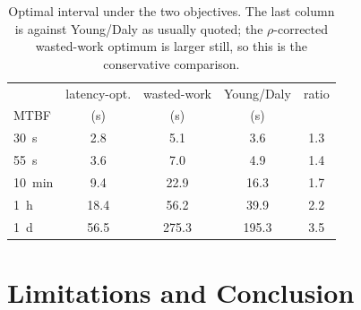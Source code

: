 \documentclass[conference]{IEEEtran}
\begin{document}
\begin{table}[t]
  \centering
  \caption{Optimal interval under the two objectives.
           The last column is against Young/Daly as usually quoted; the
           $\rho$-corrected wasted-work optimum is larger still, so this is the
           conservative comparison.}
  \label{tab:optimum}
  \begin{tabular}{l S[table-format=3.1] S[table-format=3.1] S[table-format=3.1] S[table-format=1.1]}
    \toprule
    & {latency-opt.} & {wasted-work} & {Young/Daly} & {ratio} \\
    {MTBF} & {(\si{\second})} & {(\si{\second})} & {(\si{\second})} & \\
    \midrule
    \SI{30}{\second} &  2.8 &   5.1 &   3.6 & 1.3 \\
    \SI{55}{\second} &  3.6 &   7.0 &   4.9 & 1.4 \\
    \SI{10}{\minute} &  9.4 &  22.9 &  16.3 & 1.7 \\
    \SI{1}{\hour}    & 18.4 &  56.2 &  39.9 & 2.2 \\
    \SI{1}{\day}     & 56.5 & 275.3 & 195.3 & 3.5 \\
    \bottomrule
  \end{tabular}
\end{table}

\section{Limitations and Conclusion}

\end{document}
